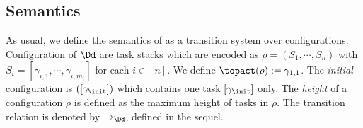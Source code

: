 \subsection{Semantics}

As usual, we define the semantics of {\DNSS} as a transition system over configurations.
Configuration of {\DNSS} $\Dd$ are task stacks which are encoded as $\rho=(S_1,\cdots, S_n)$
with $S_i = [\gamma_{i,1}, \cdots, \gamma_{i, m_i}]$ for each $i \in [n]$. We define $\topact(\rho):=\gamma_{1,1}$. The \emph{initial} configuration is $([\gamma_{\init}])$ which contains one task $[\gamma_\init]$ only. The \emph{height} of a configuration $\rho$ is defined as the maximum height of tasks in $\rho$.
The transition relation is denoted by $\rightarrow_{\Dd}$, defined in the sequel.  %
